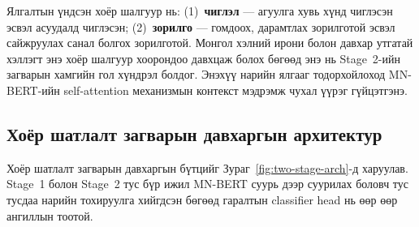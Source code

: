 Ялгалтын үндсэн хоёр шалгуур нь: (1)~\textbf{чиглэл} --- агуулга хувь хүнд
чиглэсэн эсвэл асуудалд чиглэсэн; (2)~\textbf{зорилго} --- гомдоох, дарамтлах
зорилготой эсвэл сайжруулах санал болгох зорилготой. Монгол хэлний ирони болон
давхар утгатай хэллэгт энэ хоёр шалгуур хоорондоо давхцаж болох бөгөөд энэ
нь Stage~2-ийн загварын хамгийн гол хүндрэл болдог. Энэхүү нарийн ялгааг
тодорхойлоход MN-BERT-ийн self-attention механизмын контекст мэдрэмж чухал
үүрэг гүйцэтгэнэ.

\subsection{Хоёр шатлалт загварын давхаргын архитектур}

Хоёр шатлалт загварын давхаргын бүтцийг Зураг~\ref{fig:two-stage-arch}-д
харуулав. Stage~1 болон Stage~2 тус бүр ижил MN-BERT суурь дээр суурилах
боловч тус тусдаа нарийн тохируулга хийгдсэн бөгөөд гаралтын classifier
head нь өөр өөр ангиллын тоотой.

